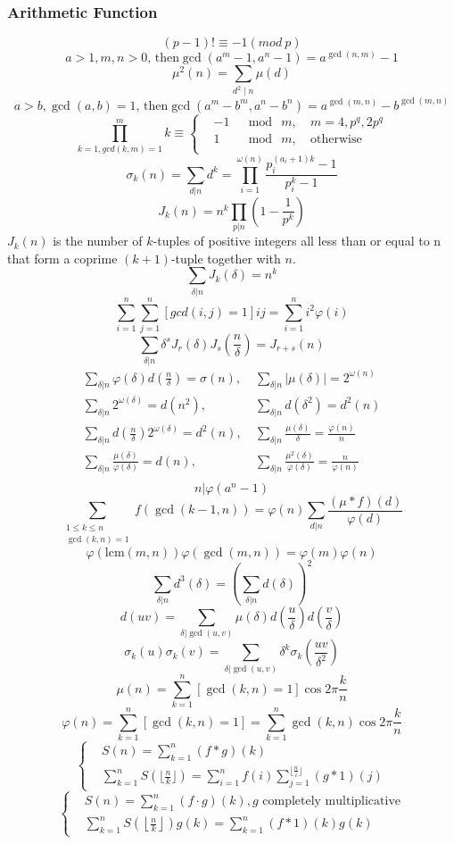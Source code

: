 \begin{footnotesize}
\subsubsection{Arithmetic Function}
\[(p-1)!\equiv-1(mod\ p)\]
\[a>1,m,n>0 \text{, then} \gcd(a^m-1,a^n-1)=a^{\gcd(n,m)}-1\]
\[ \mu^2(n) = \sum_{d^2 \mid n} \mu (d) \]
\[a>b,\gcd(a,b)=1 \text{, then} \gcd(a^m-b^m,a^n-b^n)=a^{\gcd(m,n)}-b^{\gcd(m,n)}\]
\[ \prod_{k=1,gcd(k, m) = 1}^{m} k \equiv \left\{
\begin{aligned}
&-1 & \mod\ m,\ & m = 4, p^q, 2p^q \\
&1 & \mod\ m,\ & \text{otherwise} \\
\end{aligned}
\right.
\]
\[ \sigma_k(n) = \sum_{d|n}d^k = \prod_{i=1}^{\omega(n)}\frac{p_i^{(a_i+1)k}-1}
{p_i^k-1} \]
\[ J_k(n) = n^k\prod_{p|n}(1-\frac{1}{p^k}) \]
$J_k(n)$ is the number of $k$-tuples of positive integers all less than or equal to n that form a coprime $(k + 1)$-tuple together with $n$.
\[ \sum_{\delta|n}J_k(\delta) = n^k \]
\[ \sum_{i=1}^{n} \sum_{j=1}^{n} [gcd(i,j)=1]ij =  \sum_{i=1}^{n} i^2\varphi(i) \]
\[ \sum_{\delta|n}\delta^sJ_r(\delta)J_s(\frac{n}{\delta}) = J_{r+s}(n) \]
\begin{align*}
\sum_{\delta|n}\varphi(\delta)d\left(\frac{n}{\delta}\right) = \sigma(n),&\ \sum_{\delta|n}\left| \mu(\delta) \right| = 2^{\omega(n)} \\
\sum_{\delta|n}2^{\omega(\delta)} = d(n^2),&\ \sum_{\delta|n}d(\delta^2) = d^2(n) \\
\sum_{\delta|n}d\left(\frac{n}{\delta}\right)2^{\omega(\delta)} = d^2(n),&\ \sum_{\delta|n}\frac{\mu(\delta)}{\delta} = \frac{\varphi(n)}{n} \\
\sum_{\delta|n}\frac{\mu(\delta)}{\varphi(\delta)} = d(n),&\ \sum_{\delta|n}\frac{\mu^2(\delta)}{\varphi(\delta)} = \frac{n}{\varphi(n)} \\
\end{align*}
\[ n|\varphi(a^n-1) \]
\[ \sum_{\substack{1 \leq k \leq n \\ \gcd(k, n) = 1}}f(\gcd(k-1, n)) = \varphi(n)
\sum_{d|n}\frac{(\mu*f)(d)}{\varphi(d)} \]
\[ \varphi(\mathrm{lcm}(m, n))\varphi(\gcd(m,n)) = \varphi(m)\varphi(n) \]
\[ \sum_{\delta|n}d^3(\delta) = (\sum_{\delta|n}d(\delta))^2 \]
\[ d(uv) = \sum_{\delta|\gcd(u, v)}\mu(\delta)d(\frac{u}{\delta})d(\frac{v}{\delta}) \]
\[ \sigma_k(u)\sigma_k(v) = \sum_{\delta|\gcd(u, v)}\delta^k\sigma_k(\frac{uv}{\delta^2}) \]
\[ \mu(n) = \sum_{k=1}^n[\gcd(k, n)=1]\cos{2\pi \frac{k}{n}} \]
\[ \varphi(n) = \sum_{k=1}^n[\gcd(k, n)=1] = \sum_{k=1}^n\gcd(k, n)\cos{2\pi \frac{k}{n}} \]
\[
\left\{
\begin{aligned}
&S(n) = \sum_{k=1}^n(f \ast g)(k) \\
&\sum_{k=1}^nS(\lfloor \frac n k \rfloor) = \sum_{i=1}^nf(i)\sum_{j=1}^{\lfloor \frac n i \rfloor}(g \ast 1)(j)
\end{aligned}
\right.
\]
\[
\left\{
\begin{aligned}
&S(n) = \sum_{k=1}^n(f \cdot g)(k), g \text{ completely multiplicative} \\
&\sum_{k=1}^nS\left(\left\lfloor \frac n k \right\rfloor\right)g(k) = \sum_{k=1}^n(f \ast 1)(k)g(k)
\end{aligned}
\right.
\]

\end{footnotesize}
